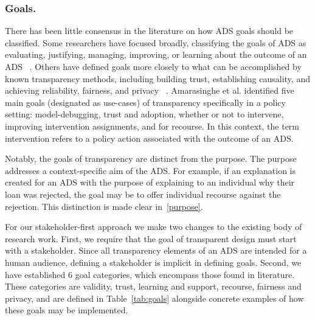 \subsubsection{Goals.} There has been little consensus in the literature on how ADS goals should be classified. Some researchers have focused broadly, classifying the goals of ADS as evaluating, justifying, managing, improving, or learning about the outcome of an ADS ~\cite{meske}.  Others have defined goals more closely to what can be accomplished by known transparency methods, including building trust, establishing causality, and achieving reliability, fairness, and privacy ~\cite{DBLP:journals/corr/abs-2012-01805}.  Amarasinghe et al. identified five main goals (designated as use-cases) of transparency specifically in a policy setting:  model-debugging, trust and adoption, whether or not to intervene, improving intervention assignments, and for recourse. In this context, the term intervention refers to a policy action associated with the outcome of an ADS.

Notably, the goals of transparency are distinct from the purpose. The purpose addresses a context-specific aim of the ADS. For example, if an explanation is created for an ADS with the purpose of explaining to an individual why their loan was rejected, the goal may be to offer individual recourse against the rejection. This distinction is made clear in~\ref{purpose}.

For our stakeholder-first approach we make two changes to the existing body of research work. First, we require that the goal of transparent design must start with a stakeholder. Since all transparency elements of an ADS are intended for a human audience, defining a stakeholder is implicit in defining goals. Second, we have established 6 goal categories, which encompass those found in literature.  These categories are validity, trust, learning and support, recourse, fairness and privacy, and are defined in Table~\ref{tab:goals} alongside concrete examples of how these goals may be implemented.

